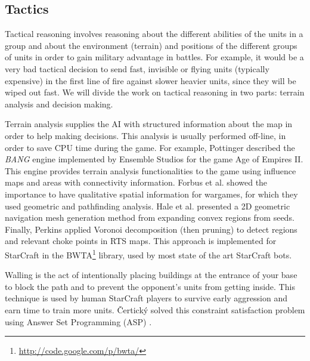 \documentclass[journal]{IEEEtran}
\begin{document}
\subsection{Tactics}

Tactical reasoning involves reasoning about the different abilities of the units in a group and about the environment (terrain) and positions of the different groups of units in order to gain military advantage in battles. For example, it would be a very bad tactical decision to send fast, invisible or flying units (typically expensive) in the first line of fire against slower heavier units, since they will be wiped out fast. We will divide the work on tactical reasoning in two parts: terrain analysis and decision making.

Terrain analysis supplies the AI with structured information about the map in order to help making decisions. This analysis is usually performed off-line, in order to save CPU time during the game. For example, Pottinger \cite{Pottinger00} described the \emph{BANG} engine implemented by Ensemble Studios for the game Age of Empires II. This engine provides terrain analysis functionalities to the game using influence maps and areas with connectivity information. 
Forbus et al. \cite{Forbus2002} showed the importance to have qualitative spatial information for wargames, for which they used geometric and pathfinding analysis. 
Hale et al. \cite{Hale08} presented a 2D geometric navigation mesh generation method from expanding convex regions from seeds. 
Finally, Perkins \cite{Perkins10} applied Voronoi decomposition (then pruning) %
to detect regions and relevant choke points in RTS maps. This approach is implemented for StarCraft in the BWTA\footnote{\url{http://code.google.com/p/bwta/}} library, used by most state of the art StarCraft bots.

Walling is the act of intentionally placing buildings at the entrance of your base to block the path and to prevent the opponent's units from getting inside. This technique is used by human StarCraft players to survive early aggression and earn time to train more units. \v{C}ertick\'{y} solved this constraint satisfaction problem using Answer Set Programming (ASP) \cite{certicky2013wallin}.
\end{document}
